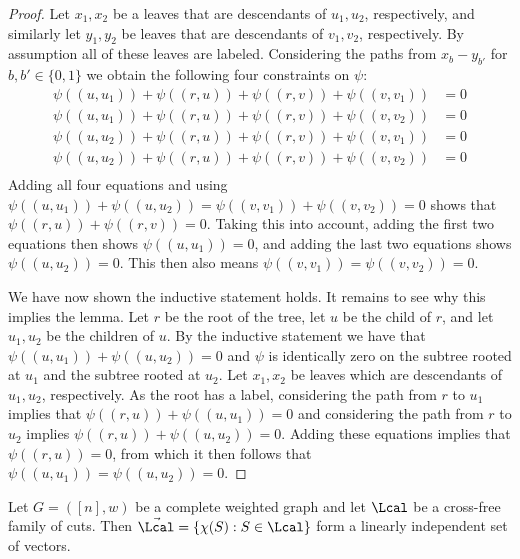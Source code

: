 \begin{proof}
Let $x_1,x_2$ be a leaves that are descendants of $u_1,u_2$, respectively, and similarly let $y_1, y_2$ be leaves that are
descendants of $v_1,v_2$, respectively.  By assumption all of these leaves are labeled.  Considering the paths from $x_b-y_{b'}$ for $b,b' \in \{0,1\}$ we obtain
the following four constraints on $\psi$:
\begin{align*}
\psi((u,u_1)) + \psi((r,u)) + \psi((r,v)) + \psi((v,v_1)) &= 0 \\
\psi((u,u_1)) + \psi((r,u)) + \psi((r,v)) + \psi((v,v_2)) &= 0 \\
\psi((u,u_2)) + \psi((r,u)) + \psi((r,v)) + \psi((v,v_1)) &= 0 \\
\psi((u,u_2)) + \psi((r,u)) + \psi((r,v)) + \psi((v,v_2)) &= 0 \\
\end{align*}
Adding all four equations and using $\psi((u,u_1)) + \psi((u,u_2)) = \psi((v,v_1)) + \psi((v,v_2))= 0$ shows that $\psi((r,u)) + \psi((r,v)) = 0$.
Taking this into account, adding the first two equations then shows $\psi((u,u_1)) = 0$, and adding the last two equations shows $\psi((u,u_2)) = 0$.
This then also means $\psi((v,v_1)) = \psi((v,v_2)) = 0$.

We have now shown the inductive statement holds.  It remains to see why this implies the lemma.  Let $r$ be the root of the tree, let $u$ be the
child of $r$, and let $u_1, u_2$ be the children of $u$.  By the inductive statement we have that $\psi((u,u_1)) + \psi((u,u_2)) = 0$ and $\psi$ is
identically zero on the subtree rooted at $u_1$ and the subtree rooted at $u_2$.  Let $x_1,x_2$ be leaves which are descendants of $u_1, u_2$, respectively.
As the root has a label, considering the path from $r$ to $u_1$ implies that $\psi((r,u)) + \psi((u,u_1)) = 0$ and considering the path from $r$ to $u_2$
implies $\psi((r,u)) + \psi((u,u_2)) = 0$.  Adding these equations implies that $\psi((r,u)) = 0$, from which it then follows that $\psi((u,u_1)) = \psi((u,u_2)) = 0$.
\end{proof}

\begin{lemma}
\label{prop:lin_ind}
Let $G = ([n],w)$ be a complete weighted graph and let $\Lcal$ be a cross-free family of cuts.  Then $\vec{\Lcal} = \{\chi(S): S \in \Lcal\}$ form a linearly independent set of vectors.
\end{lemma}

